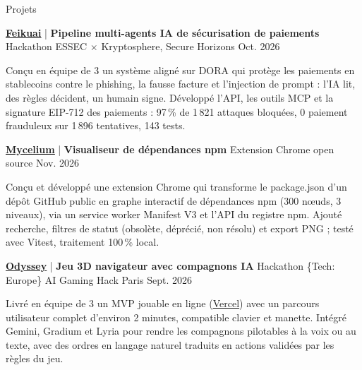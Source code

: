 \documentclass[11pt]{cv_template}
\begin{document}
\begin{cv}
\begin{cvsection}{Projets}

\begin{cvsubsection}
{\textbf{\href{https://github.com/CHENLongyeLucien/Feikuai}{\underline{Feikuai}}} | \textbf{Pipeline multi-agents IA de sécurisation de paiements}} {Hackathon ESSEC $\times$ Kryptosphere, Secure Horizons} {Oct. 2026} {}

\listitem Conçu en équipe de 3 un système aligné sur DORA qui protège les paiements en stablecoins contre le phishing, la fausse facture et l'injection de prompt : l'IA lit, des règles décident, un humain signe.
\listitem Développé l'API, les outils MCP et la signature EIP-712 des paiements : 97\,\% de 1\,821 attaques bloquées, 0 paiement frauduleux sur 1\,896 tentatives, 143 tests.

\end{cvsubsection}

\begin{cvsubsection}
{\textbf{\href{https://github.com/CHENLongyeLucien/Mycelium}{\underline{Mycelium}}} | \textbf{Visualiseur de dépendances npm}} {Extension Chrome open source} {Nov. 2026} {}

\listitem Conçu et développé une extension Chrome qui transforme le package.json d'un dépôt GitHub public en graphe interactif de dépendances npm (300 nœuds, 3 niveaux), via un service worker Manifest V3 et l'API du registre npm.
\listitem Ajouté recherche, filtres de statut (obsolète, déprécié, non résolu) et export PNG ; testé avec Vitest, traitement 100\,\% local.

\end{cvsubsection}

\begin{cvsubsection}
{\textbf{\href{https://github.com/CHENLongyeLucien/Odyssey}{\underline{Odyssey}}} | \textbf{Jeu 3D navigateur avec compagnons IA}} {Hackathon \{Tech: Europe\} AI Gaming Hack Paris} {Sept. 2026} {}

\listitem Livré en équipe de 3 un MVP jouable en ligne (\href{https://troy-120.vercel.app}{\underline{Vercel}}) avec un parcours utilisateur complet d'environ 2 minutes, compatible clavier et manette.
\listitem Intégré Gemini, Gradium et Lyria pour rendre les compagnons pilotables à la voix ou au texte, avec des ordres en langage naturel traduits en actions validées par les règles du jeu.

\end{cvsubsection}

\end{cvsection}


\end{cv}
\end{document}
